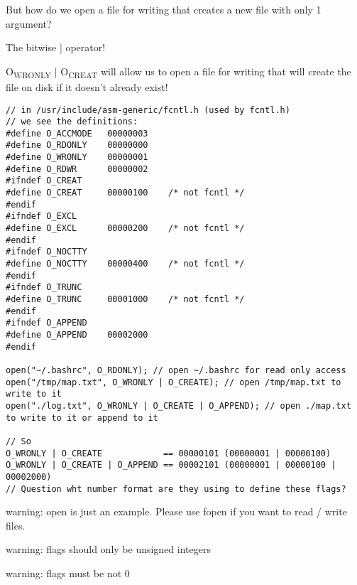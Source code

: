 \documentclass[11pt]{article}
\begin{document}
But how do we open a file for writing that creates a new file with only 1 argument?

The bitwise | operator! 

O\textsubscript{WRONLY} | O\textsubscript{CREAT} will allow us to open a file for writing that will
create the file on disk if it doesn't already exist!


\begin{verbatim}
// in /usr/include/asm-generic/fcntl.h (used by fcntl.h)
// we see the definitions:
#define O_ACCMODE	00000003
#define O_RDONLY	00000000
#define O_WRONLY	00000001
#define O_RDWR		00000002
#ifndef O_CREAT
#define O_CREAT		00000100	/* not fcntl */
#endif
#ifndef O_EXCL
#define O_EXCL		00000200	/* not fcntl */
#endif
#ifndef O_NOCTTY
#define O_NOCTTY	00000400	/* not fcntl */
#endif
#ifndef O_TRUNC
#define O_TRUNC		00001000	/* not fcntl */
#endif
#ifndef O_APPEND
#define O_APPEND	00002000
#endif

open("~/.bashrc", O_RDONLY); // open ~/.bashrc for read only access
open("/tmp/map.txt", O_WRONLY | O_CREATE); // open /tmp/map.txt to write to it
open("./log.txt", O_WRONLY | O_CREATE | O_APPEND); // open ./map.txt to write to it or append to it

// So 
O_WRONLY | O_CREATE            == 00000101 (00000001 | 00000100)
O_WRONLY | O_CREATE | O_APPEND == 00002101 (00000001 | 00000100 | 00002000)
// Question wht number format are they using to define these flags?
\end{verbatim}

warning: open is just an example. Please use fopen if you want to read / write files.

warning: flags should only be unsigned integers

warning: flags must be not 0
\end{document}
